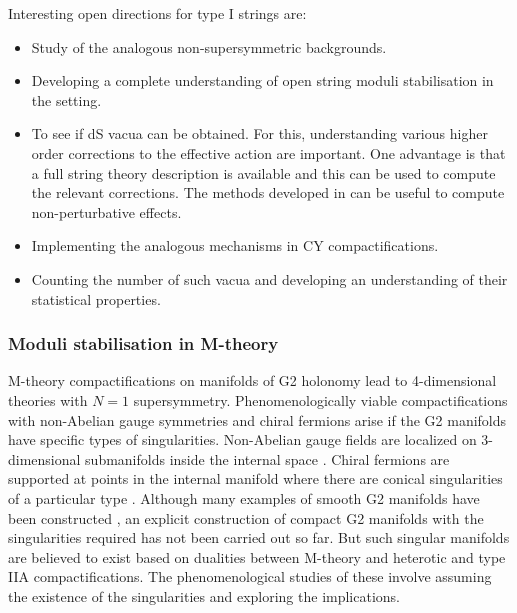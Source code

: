 Interesting open directions for type I strings are:
\begin{itemize}

\item Study of the analogous non-supersymmetric backgrounds.

\item Developing a complete understanding of open string moduli stabilisation in the setting.

\item To see if dS vacua can be obtained. For this, understanding various higher order corrections to the effective action are important. One advantage is that a full string theory description is available and this can be used to compute the relevant corrections. The methods developed in  \cite{Bianchi:2007fx} can be useful to compute non-perturbative effects.

\item Implementing the analogous mechanisms in CY compactifications.

\item Counting the number of such vacua and developing an understanding of their statistical properties.
\end{itemize}

\subsubsection {Moduli stabilisation in M-theory} 

M-theory compactifications on manifolds of G2 holonomy lead to 4-dimensional theories with $N=1$ supersymmetry. Phenomenologically viable compactifications with non-Abelian gauge symmetries and chiral fermions arise if the  G2 manifolds have specific types of singularities. Non-Abelian gauge fields are localized on 3-dimensional submanifolds inside the internal space \cite{Acharya:1998pm}. Chiral fermions are supported at points in the internal manifold where there are conical singularities of a particular type \cite{Acharya:2001gy}.  Although many examples of smooth G2 manifolds have been constructed \cite{Kovalev:2001zr, Joyce:2002eb}, an explicit construction of compact G2 manifolds with the singularities required  has not been carried out so far. But such singular manifolds are believed to exist based on dualities between M-theory and  heterotic and type IIA compactifications. The phenomenological studies of these involve assuming the existence of the singularities and exploring the implications.

